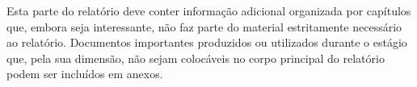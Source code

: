 
Esta parte do relatório deve conter informação adicional organizada por capítulos que, embora seja interessante, não faz parte do material estritamente necessário ao relatório. Documentos importantes produzidos ou utilizados durante o estágio que, pela sua dimensão, não sejam colocáveis no corpo principal do relatório podem ser incluídos em anexos.
